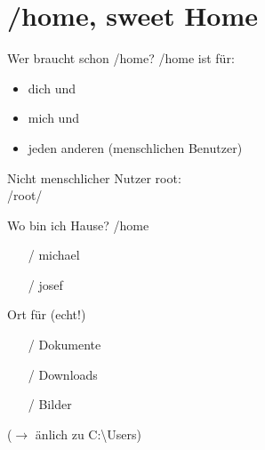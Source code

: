 \section[/home]{/home, sweet Home}
\begin{frame}{Wer braucht schon /home?}
/home ist für:
\begin{itemize}
 \item dich und
 \item mich und
 \item jeden anderen (menschlichen Benutzer)
\end{itemize}
Nicht menschlicher Nutzer root:\\
/root/




\end{frame}

\begin{frame}{Wo bin ich Hause?}
/home
\begin{itemize}
  \item [/] michael
  \item [/] josef
\end{itemize}
\vfill
Ort für  {\small (echt!)}
\begin{itemize}
 \item [/] Dokumente
 \item [/] Downloads
 \item [/] Bilder
\end{itemize}
\vfill
($\longrightarrow$ änlich zu C:\textbackslash Users)

\vfill
\end{frame}